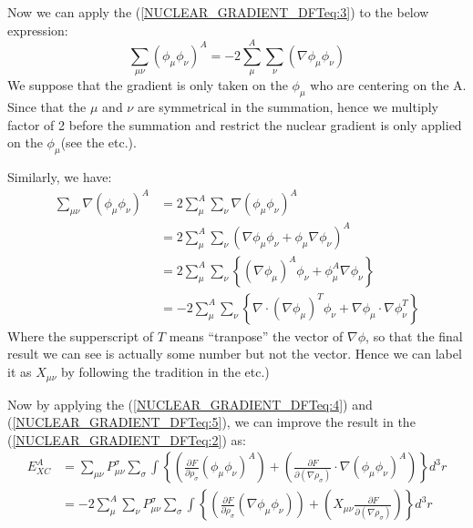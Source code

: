 Now we can apply the (\ref{NUCLEAR_GRADIENT_DFTeq:3}) to the
below expression:
\begin{equation}
  \sum_{\mu\nu}(\phi_{\mu}\phi_{\nu})^{A} = 
  -2\sum_{\mu}^{A}\sum_{\nu}(\nabla\phi_{\mu}\phi_{\nu})
\label{NUCLEAR_GRADIENT_DFTeq:4}
\end{equation} 
We suppose that the gradient is only taken on the $\phi_{\mu}$ who
are centering on the A. Since that the $\mu$ and $\nu$ are
symmetrical in the summation, hence we multiply factor of 2 before
the summation and restrict the nuclear gradient is only applied on
the $\phi_{\mu}$(see the \cite{CPL_1992_6_557,
johnson:5612} etc.).

Similarly, we have:
\begin{equation}
\label{NUCLEAR_GRADIENT_DFTeq:5}
\begin{split}
  \sum_{\mu\nu}\nabla(\phi_{\mu}\phi_{\nu})^{A} &= 
  2\sum_{\mu}^{A}\sum_{\nu}\nabla(\phi_{\mu}\phi_{\nu})^{A} \\ 
  &= 
  2\sum_{\mu}^{A}\sum_{\nu}(\nabla\phi_{\mu}\phi_{\nu} +
\phi_{\mu}\nabla\phi_{\nu})^{A} \\
   &= 
  2\sum_{\mu}^{A}\sum_{\nu}\left\lbrace
(\nabla\phi_{\mu})^{A}\phi_{\nu} +
\phi_{\mu}^{A}\nabla\phi_{\nu}\right\rbrace  \\
&=-2\sum_{\mu}^{A}\sum_{\nu}\left\lbrace
\nabla\cdotp(\nabla\phi_{\mu})^{T}\phi_{\nu} +
\nabla\phi_{\mu}\cdotp\nabla\phi_{\nu}^{T}\right\rbrace
\end{split}
\end{equation}
Where the supperscript of $T$ means ``tranpose'' the vector of
$\nabla\phi$, so that the final result we can see is actually some
number but not the vector. Hence we can label it as $X_{\mu\nu}$ by
following the tradition in the \cite{CPL_1992_6_557,
johnson:5612} etc.) 

Now by applying the (\ref{NUCLEAR_GRADIENT_DFTeq:4}) and
(\ref{NUCLEAR_GRADIENT_DFTeq:5}), we can improve the result in the
(\ref{NUCLEAR_GRADIENT_DFTeq:2}) as:
\begin{equation}
\label{NUCLEAR_GRADIENT_DFTeq:7}
\begin{split}
 E_{XC}^{A} &=  \sum_{\mu\nu}
P_{\mu\nu}^{\sigma}\sum_{\sigma}\int\left\lbrace
\left(
\frac{\partial F}{\partial \rho_{\sigma}}(\phi_{\mu}\phi_{\nu
})^{A}\right) + \left(
    \frac{\partial F}{\partial (\nabla\rho_{\sigma})}
    \cdotp\nabla(\phi_{\mu}\phi_{\nu
})^{A}\right)\right\rbrace  d^{3}r \\
&=  -2\sum_{\mu}^{A}\sum_{\nu}
P_{\mu\nu}^{\sigma}\sum_{\sigma}\int\left\lbrace
\left(
\frac{\partial F}{\partial \rho_{\sigma}}(\nabla\phi_{\mu}\phi_{\nu
})\right) + \left(
    X_{\mu\nu}\frac{\partial F}{\partial (\nabla\rho_{\sigma})}
    \right)\right\rbrace  d^{3}r
\end{split}
\end{equation}

